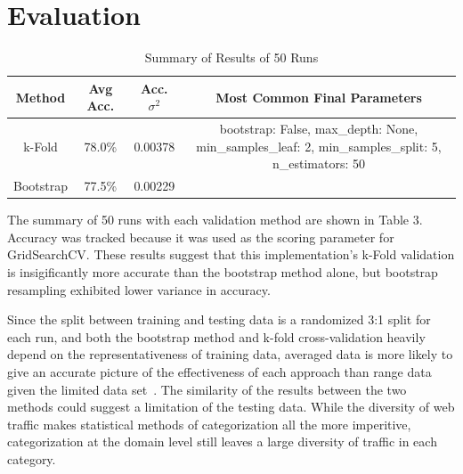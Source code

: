 \documentclass[10pt,sigconf,letterpaper,nonacm]{acmart}
\begin{document}
\section{Evaluation}
\begin{table}
  \caption{Summary of Results of 50 Runs}
  \begin{tabular}{c|c|c|c}
    Method & Avg Acc. & Acc. $\sigma^2$ & Most Common Final Parameters \\
    \midrule
    k-Fold & 78.0\% & 0.00378 & bootstrap: False, max\_depth: None, min\_samples\_leaf: 2,
    min\_samples\_split: 5, n\_estimators: 50\\
    Bootstrap & 77.5\% & 0.00229
  \end{tabular}
\end{table}

\par The summary of 50 runs with each validation method are shown in Table 3. Accuracy
was tracked because it was used as the scoring parameter for GridSearchCV. These results
suggest that this implementation's k-Fold validation is insigificantly more accurate than
the bootstrap method alone, but bootstrap resampling exhibited lower variance in accuracy.
\par Since the split between training and testing data is a randomized 3:1 split for each
run, and both the bootstrap method and k-fold cross-validation heavily depend on the
representativeness of training data, averaged data is more likely to give an accurate
picture of the effectiveness of each approach than range data given the limited data
set~\cite{Ljumovic2015}. The similarity of the results between the two methods could
suggest a limitation of the testing data. While the diversity of web traffic makes
statistical methods of
categorization all the more imperitive, categorization at the domain level still leaves a
large diversity of traffic in each category.
\end{document}
